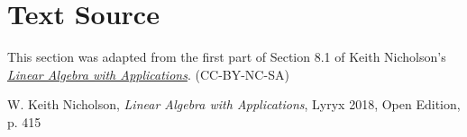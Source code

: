\documentclass{ximera}
\begin{document}
\section*{Text Source} This section was adapted from the first part of Section 8.1 of Keith Nicholson's \href{https://open.umn.edu/opentextbooks/textbooks/linear-algebra-with-applications}{\it Linear Algebra with Applications}. (CC-BY-NC-SA)

W. Keith Nicholson, {\it Linear Algebra with Applications}, Lyryx 2018, Open Edition, p. 415 




\end{document}
